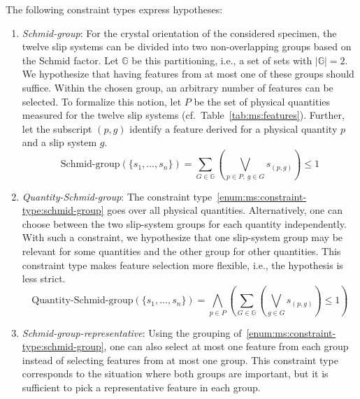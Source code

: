 The following constraint types express hypotheses:
%
\begin{enumerate}[label=(D\arabic*), wide]
	\item\label{enum:ms:constraint-type:schmid-group} \emph{Schmid-group}:
	For the crystal orientation of the considered specimen, the twelve slip systems can be divided into two non-overlapping groups based on the Schmid factor.
	Let $\mathbb{G}$ be this partitioning, i.e., a set of sets with $|\mathbb{G}| = 2$.
	We hypothesize that having features from at most one of these groups should suffice.
	Within the chosen group, an arbitrary number of features can be selected.
	To formalize this notion, let $P$ be the set of physical quantities measured for the twelve slip systems (cf.~Table~\ref{tab:ms:features}).
	Further, let the subscript $(p,g)$ identify a feature derived for a physical quantity $p$ and a slip system $g$.
	\begin{equation}
		\text{Schmid-group}(\{s_1, \dots, s_n\}) = \sum_{G \in \mathbb{G}} \left( \bigvee_{p \in P,~g \in G} s_{(p,g)} \right) \leq 1
		\label{eq:ms:constraint:schmid-group}
	\end{equation}
	\item\label{enum:ms:constraint-type:quantity-schmid-group} \emph{Quantity-Schmid-group}:
	The constraint type~\ref{enum:ms:constraint-type:schmid-group} goes over all physical quantities.
	Alternatively, one can choose between the two slip-system groups for each quantity independently.
	With such a constraint, we hypothesize that one slip-system group may be relevant for some quantities and the other group for other quantities.
	This constraint type makes feature selection more flexible, i.e., the hypothesis is less strict.
	\begin{equation}
		\text{Quantity-Schmid-group}(\{s_1, \dots, s_n\}) = \bigwedge_{p \in P} \left( \sum_{G \in \mathbb{G}} \left( \bigvee_{g \in G} s_{(p,g)} \right) \leq 1 \right)
		\label{eq:ms:constraint:quantity-schmid-group}
	\end{equation}
	\item\label{enum:ms:constraint-type:schmid-group-representative} \emph{Schmid-group-representative}:
	Using the grouping of~\ref{enum:ms:constraint-type:schmid-group}, one can also select at most one feature from each group instead of selecting features from at most one group.
	This constraint type corresponds to the situation where both groups are important, but it is sufficient to pick a representative feature in each group.
	\begin{equation}

\end{equation}
\end{enumerate}
